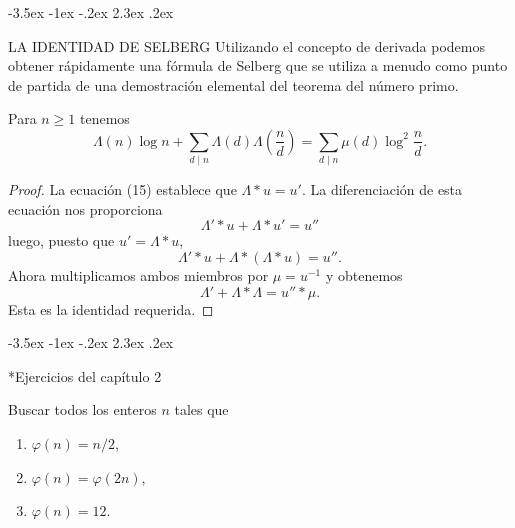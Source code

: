 \documentclass[12pt,a4paper]{book}
\makeatletter
\renewcommand\section{\@startsection{section}{1}{\z@}%
  {-3.5ex \@plus -1ex \@minus -.2ex}%
  {2.3ex \@plus .2ex}%
  {\normalfont\Large\bfseries\raggedright}}
\makeatother
\begin{document}
    \section{LA IDENTIDAD DE SELBERG}
    Utilizando el concepto de derivada podemos obtener rápidamente una fórmula de Selberg
    que se utiliza a menudo como punto de partida de una demostración elemental del
    teorema del número primo.

    \begin{teorema}
        Para $n\geq1$ tenemos
        \begin{equation*}
            \Lambda(n)\log n+\sum_{d\mid n}\Lambda(d)\Lambda\left(\frac{n}{d}\right)
            =\sum_{d\mid n}\mu(d)\log^{2}\frac{n}{d}.
        \end{equation*}
    \end{teorema}

    \begin{proof}
        La ecuación (15) establece que $\Lambda*u=u'$. La diferenciación de esta ecuación
        nos proporciona
        \begin{equation*}
            \Lambda'*u+\Lambda*u'=u''
        \end{equation*}
        luego, puesto que $u'=\Lambda*u$,
        \begin{equation*}
            \Lambda'*u+\Lambda*(\Lambda*u)=u''.
        \end{equation*}
        Ahora multiplicamos ambos miembros por $\mu=u^{-1}$ y obtenemos
        \begin{equation*}
            \Lambda'+\Lambda*\Lambda=u''*\mu.
        \end{equation*}
        Esta es la identidad requerida.
    \end{proof}

    \section*{Ejercicios del capítulo 2}

    \begin{ejercicio}
        Buscar todos los enteros $n$ tales que
        \begin{enumerate}
            \item[(a)] $\varphi(n)=n/2$,
            \item[(b)] $\varphi(n)=\varphi(2n)$,
            \item[(c)] $\varphi(n)=12$.
        \end{enumerate}
    \end{ejercicio}
\end{document}
